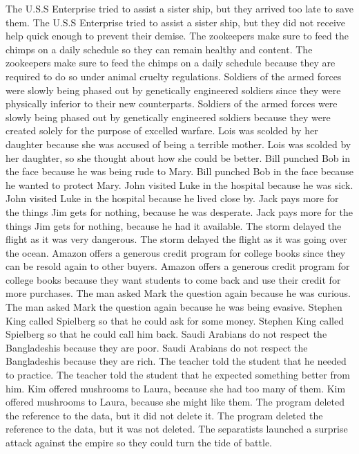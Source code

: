 \documentclass{article}
\begin{document}
\begin{enumerate}
	The U.S.S Enterprise tried to assist a sister ship, but they arrived too late to save them.
	The U.S.S Enterprise tried to assist a sister ship, but they did not receive help quick enough to prevent their demise.
	The zookeepers make sure to feed the chimps on a daily schedule so they can remain healthy and content.
	The zookeepers make sure to feed the chimps on a daily schedule because they are required to do so under animal cruelty regulations.
	Soldiers of the armed forces were slowly being phased out by genetically engineered soldiers since they were physically inferior to their new counterparts.
	Soldiers of the armed forces were slowly being phased out by genetically engineered soldiers because they were created solely for the purpose of excelled warfare.
	Lois was scolded by her daughter because she was accused of being a terrible mother.
	Lois was scolded by her daughter, so she thought about how she could be better.
	Bill punched Bob in the face because he was being rude to Mary.
	Bill punched Bob in the face because he wanted to protect Mary.
	John visited Luke in the hospital because he was sick.
	John visited Luke in the hospital because he lived close by.
	Jack pays more for the things Jim gets for nothing, because he was desperate.
	Jack pays more for the things Jim gets for nothing, because he had it available.
	The storm delayed the flight as it was very dangerous.
	The storm delayed the flight as it was going over the ocean.
	Amazon offers a generous credit program for college books since they can be resold again to other buyers.
	Amazon offers a generous credit program for college books because they want students to come back and use their credit for more purchases.
	The man asked Mark the question again because he was curious.
	The man asked Mark the question again because he was being evasive.
	Stephen King called Spielberg so that he could ask for some money.
	Stephen King called Spielberg so that he could call him back.
	Saudi Arabians do not respect the Bangladeshis because they are poor.
	Saudi Arabians do not respect the Bangladeshis because they are rich.
	The teacher told the student that he needed to practice.
	The teacher told the student that he expected something better from him.
	Kim offered mushrooms to Laura, because she had too many of them.
	Kim offered mushrooms to Laura, because she might like them.
	The program deleted the reference to the data, but it did not delete it.
	The program deleted the reference to the data, but it was not deleted.
	The separatists launched a surprise attack against the empire so they could turn the tide of battle.

\end{enumerate}
\end{document}
